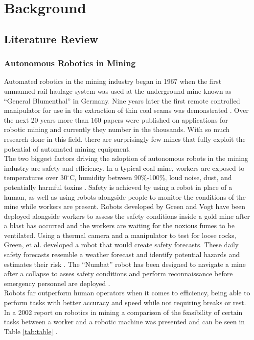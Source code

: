 \chapter{Background}
\label{chap:background}
\section{Literature Review}
\subsection{Autonomous Robotics in Mining}
Automated robotics in the mining industry began in 1967 when the first unmanned rail haulage system was used at the underground mine known as ``General Blumenthal'' in Germany. Nine years later the first remote controlled manipulator for use in the extraction of thin coal seams was demonstrated \cite{mani}. Over the next 20 years more than 160 papers were published on applications for robotic mining and currently they number in the thousands. With so much research done in this field, there are surprisingly few mines that fully exploit the potential of automated mining equipment.\\

The two biggest factors driving the adoption of autonomous robots in the mining industry are safety and efficiency. In a typical coal mine, workers are exposed to temperatures over 30$^\circ$C, humidity between 90\%-100\%, loud noise, dust, and potentially harmful toxins \cite{temp}. Safety is achieved by using a robot in place of a human, as well as using robots alongside people to monitor the conditions of the mine while workers are present. Robots developed by Green \cite{green} and Vogt \cite{vogt} have been deployed alongside workers to assess the safety conditions inside a gold mine after a blast has occurred and the workers are waiting for the noxious fumes to be ventilated. Using a thermal camera and a manipulator to test for loose rocks, Green, et al. developed a robot that would create safety forecasts. These daily safety forecasts resemble a weather forecast and identify potential hazards and estimates their risk \cite{greener}. The ``Numbat'' robot has been designed to navigate a mine after a collapse to asses safety conditions and perform reconnaissance before emergency personnel are deployed \cite{numbat2}.\\

Robots far outperform human operators when it comes to efficiency, being able to perform tasks with better accuracy and speed while not requiring breaks or rest. In a 2002 report on robotics in mining a comparison of the feasibility of certain tasks between a worker and a robotic machine was presented and can be seen in Table \ref{tab:table} \cite{table}.\\

